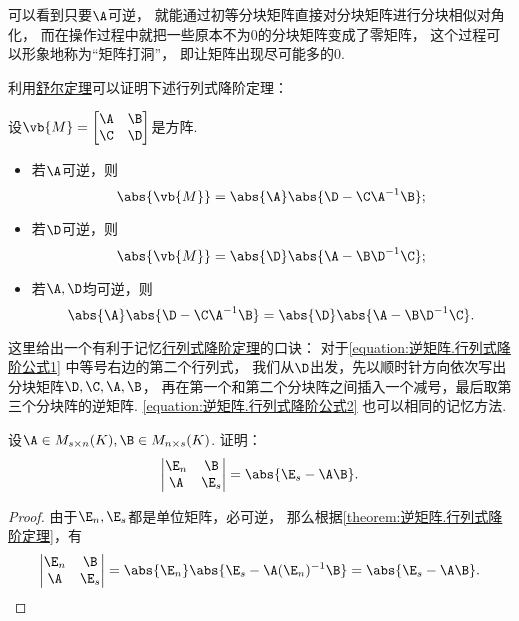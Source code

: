 可以看到只要\(\A\)可逆，
就能通过初等分块矩阵直接对分块矩阵进行分块相似对角化，
而在操作过程中就把一些原本不为0的分块矩阵变成了零矩阵，
这个过程可以形象地称为“矩阵打洞”，
即让矩阵出现尽可能多的0.

利用\hyperref[theorem:逆矩阵.舒尔定理]{舒尔定理}可以证明下述行列式降阶定理：
\begin{theorem}[行列式降阶定理]\label{theorem:逆矩阵.行列式降阶定理}
\def\M{\vb{M}}
设\(\M = \begin{bmatrix}
	\A & \B \\
	\C & \D
\end{bmatrix}\)是方阵.
\begin{itemize}
	\item 若\(\A\)可逆，则\begin{equation}\label{equation:逆矩阵.行列式降阶公式1}
		\abs{\M} = \abs{\A} \abs{\D - \C \A^{-1} \B};
	\end{equation}

	\item 若\(\D\)可逆，则\begin{equation}\label{equation:逆矩阵.行列式降阶公式2}
		\abs{\M} = \abs{\D} \abs{\A - \B \D^{-1} \C};
	\end{equation}

	\item 若\(\A,\D\)均可逆，则\begin{equation}
		\abs{\A} \abs{\D - \C \A^{-1} \B}
		= \abs{\D} \abs{\A - \B \D^{-1} \C}.
	\end{equation}
\end{itemize}
\end{theorem}
\begin{remark}
这里给出一个有利于记忆\hyperref[theorem:逆矩阵.行列式降阶定理]{行列式降阶定理}的口诀：
对于\cref{equation:逆矩阵.行列式降阶公式1} 中等号右边的第二个行列式，
我们从\(\D\)出发，先以顺时针方向依次写出分块矩阵\(\D,\C,\A,\B\)，
再在第一个和第二个分块阵之间插入一个减号，最后取第三个分块阵的逆矩阵.
\cref{equation:逆矩阵.行列式降阶公式2} 也可以相同的记忆方法.
\end{remark}

\begin{example}\label{example:逆矩阵.行列式降阶定理的重要应用1}
设\(\A \in M_{s \times n}(K),
\B \in M_{n \times s}(K)\).
证明：\[
	\begin{vmatrix}
		\E_n & \B \\
		\A & \E_s
	\end{vmatrix} = \abs{\E_s - \A\B}.
\]
\begin{proof}
由于\(\E_n,\E_s\)都是单位矩阵，必可逆，
那么根据\cref{theorem:逆矩阵.行列式降阶定理}，有\[
	\begin{vmatrix}
		\E_n & \B \\
		\A & \E_s
	\end{vmatrix}
	= \abs{\E_n} \abs{\E_s - \A(\E_n)^{-1}\B}
	= \abs{\E_s - \A\B}.
	\qedhere
\]
\end{proof}
\end{example}

